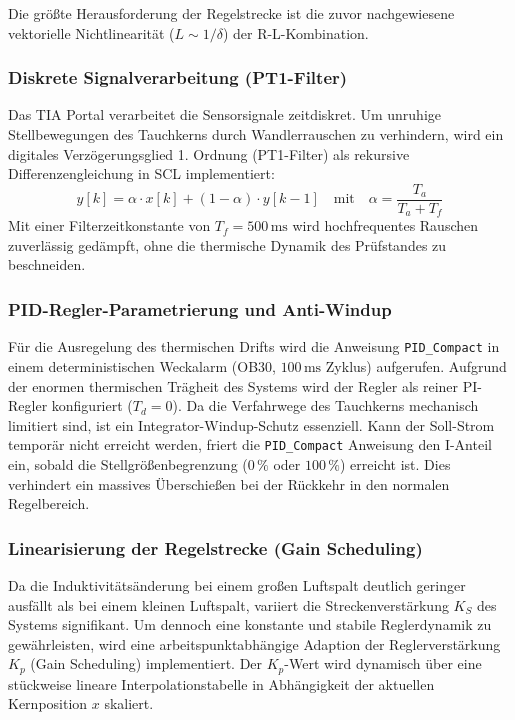 Die größte Herausforderung der Regelstrecke ist die zuvor nachgewiesene vektorielle Nichtlinearität ($L \sim 1/\delta$) der R-L-Kombination.
\subsubsection{Diskrete Signalverarbeitung (PT1-Filter)}
Das TIA Portal verarbeitet die Sensorsignale zeitdiskret. Um unruhige Stellbewegungen des Tauchkerns durch Wandlerrauschen zu verhindern, wird ein digitales Verzögerungsglied 1. Ordnung (PT1-Filter) als rekursive Differenzengleichung in SCL implementiert:
\begin{equation}
    y[k] = \alpha \cdot x[k] + (1 - \alpha) \cdot y[k-1] \quad \text{mit} \quad \alpha = \frac{T_a}{T_a + T_f}
\end{equation}
Mit einer Filterzeitkonstante von $T_f = 500\,\text{ms}$ wird hochfrequentes Rauschen zuverlässig gedämpft, ohne die thermische Dynamik des Prüfstandes zu beschneiden.
\subsubsection{PID-Regler-Parametrierung und Anti-Windup}
Für die Ausregelung des thermischen Drifts wird die Anweisung \texttt{PID\_Compact} in einem deterministischen Weckalarm (OB30, $100\,\text{ms}$ Zyklus) aufgerufen. Aufgrund der enormen thermischen Trägheit des Systems wird der Regler als reiner PI-Regler konfiguriert ($T_d = 0$). 
Da die Verfahrwege des Tauchkerns mechanisch limitiert sind, ist ein Integrator-Windup-Schutz essenziell. Kann der Soll-Strom temporär nicht erreicht werden, friert die \texttt{PID\_Compact} Anweisung den I-Anteil ein, sobald die Stellgrößenbegrenzung ($0\,\%$ oder $100\,\%$) erreicht ist. Dies verhindert ein massives Überschießen bei der Rückkehr in den normalen Regelbereich.
\subsubsection{Linearisierung der Regelstrecke (Gain Scheduling)}
Da die Induktivitätsänderung bei einem großen Luftspalt deutlich geringer ausfällt als bei einem kleinen Luftspalt, variiert die Streckenverstärkung $K_S$ des Systems signifikant. Um dennoch eine konstante und stabile Reglerdynamik zu gewährleisten, wird eine arbeitspunktabhängige Adaption der Reglerverstärkung $K_p$ (Gain Scheduling) implementiert. Der $K_p$-Wert wird dynamisch über eine stückweise lineare Interpolationstabelle in Abhängigkeit der aktuellen Kernposition $x$ skaliert.

